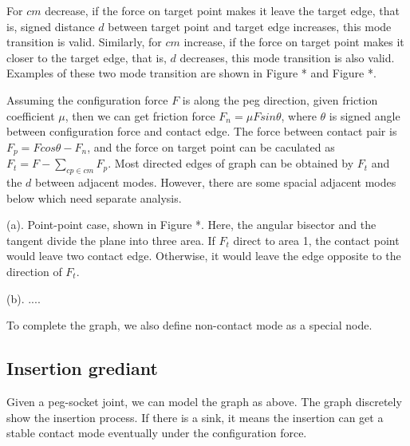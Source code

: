 For ${cm}$ decrease, if the force on target point makes it leave the target edge, that is, signed distance ${d}$ between target point and target edge increases, this mode transition is valid. 
Similarly, for ${cm}$ increase, if the force on target point makes it closer to the target edge, that is, ${d}$ decreases, this mode transition is also valid. Examples of these two mode transition are shown in Figure * and Figure *.


Assuming the configuration force ${F}$ is along the peg direction, given friction coefficient $\mu$, then we can get friction force ${F_n}=\mu{F}{sin}\theta$, where $\theta$ is signed angle between configuration force and contact edge. The force between contact pair is ${F_p}={F}{cos}\theta-{F_n}$,  and the force on target point can be caculated as ${F_t}={F}-\sum_{{cp}\in{cm}} {F_p}$. Most directed edges of graph can be obtained by ${F_t}$ and the ${d}$ between adjacent modes. However, there are some spacial adjacent modes below which need separate analysis. 

(a). Point-point case, shown in Figure *. Here, the angular bisector and the  tangent divide the plane into three area. If ${F_t}$ direct to area 1, the contact point would leave two contact edge. Otherwise, it would leave the edge opposite to the direction of ${F_t}$.

 
(b). ....

To complete the graph, we also define non-contact mode as a special node.

\subsection{Insertion grediant}

Given a peg-socket joint, we can model the graph as above. The graph discretely show the insertion process. If there is a sink, it means the insertion can get a stable contact mode eventually under the configuration force.

